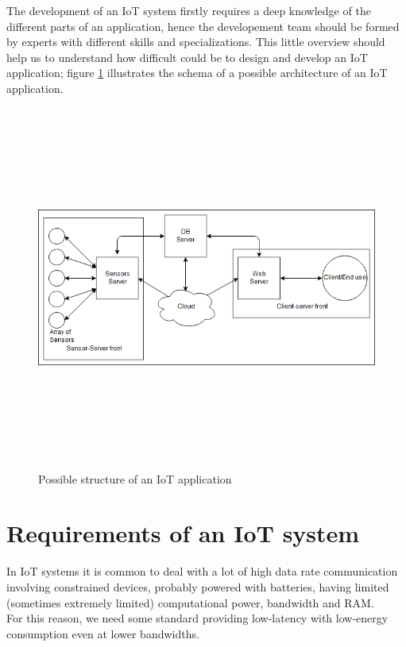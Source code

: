 \documentclass[12pt]{report}
\begin{document}
The development of an IoT system firstly requires a deep knowledge of the different parts of an application, hence the developement team should be formed by experts with different skills and specializations.\newline
This little overview should help us to understand how difficult could be to design and develop an IoT application; figure \ref{fig:iotstructure} illustrates the schema of a possible architecture of an IoT application.\\

\begin{figure}[H]
\includegraphics[width=13cm,height=12cm,keepaspectratio]{iotapp_architecture}
\caption{Possible structure of an IoT application}
\label{fig:iotstructure}
\end{figure}

\bigskip
\section{Requirements of an IoT system}
\bigskip
In IoT systems it is common to deal with a lot of high data rate communication involving constrained devices, probably powered with batteries, having limited (sometimes extremely limited) computational power, bandwidth and RAM.\\
For this reason, we need some standard providing low-latency with low-energy consumption even at lower bandwidths.\\
\end{document}
